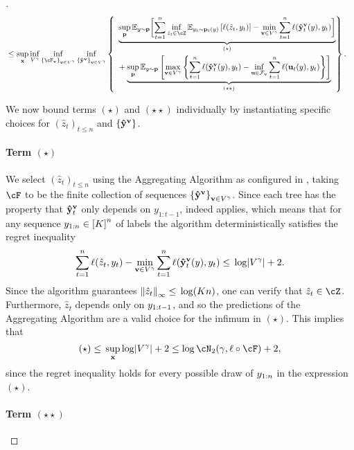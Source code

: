 \begin{proof}[]
{\begin{align}
& \leq\sup_{\x}\inf_{V^{\gamma}}\inf_{\crl*{\cF_{\vv}}_{\vv\in{}V^{\gamma}}}\inf_{\crl*{\yhtree^{\vv}}_{\vv\in{}V^{\gamma}}}\left\{\begin{aligned}~& \underbrace{\sup_{\p} \mathbb{E}_{y \sim \p}\biggl[ \sum_{t=1}^n \inf_{\hat{z}_t\in\cZ} \mathbb{E}_{y_t \sim \p_t(y)}\left[\ell(\hat{z}_t,y_t)\right] - \min_{\vv \in V^\gamma}\sum_{t=1}^n \ell(\yhtree_t^\vv(y),y_t)\biggr]}_{(\star)} \\
  & + \underbrace{\sup_{\p}\mathbb{E}_{y \sim \p}\left[ \max_{\vv \in V^\gamma}\left\{ \sum_{t=1}^n \ell(\yhtree_t^\vv(y),y_t) -  \inf_{\uu \in \mathcal{F}_\vv} \sum_{t=1}^n \ell(\uu_t(y),y_t)\right\}\right]}_{(\star\star)}
  \end{aligned}\right\}.\label{eq:interval}
\end{align}}

We now bound terms $(\star)$ and $(\star\star)$ individually by instantiating specific choices for $(\hat{z}_t)_{t\leq{}n}$ and $\crl*{\yhtree^{\vv}}$.

\paragraph{Term $(\star)$}
We select $(\hat{z}_t)_{t\leq{}n}$ using the Aggregating Algorithm as configured in , taking $\cF$ to be the finite collection of sequences $\crl*{\yhtree^{\vv}}_{\vv\in{}V^{\gamma}}$. Since each tree has the property that $\yhtree^{\vv}_{t}$ only depends on $y_{1:t-1}$,  indeed applies, which means that for any sequence $\yr[n]\in\brk*{K}^{n}$ of labels the algorithm deterministically satisfies the regret inequality
\[
\sum_{t=1}^n \ell(\hat{z}_t,y_t) - \min_{\vv \in V^\gamma}\sum_{t=1}^n \ell(\yhtree_t^\vv(y),y_t) \leq{} \log\abs*{V^{\gamma}} + 2.
\]
Since the algorithm guarantees $\nrm*{\hat{z}_{t}}_{\infty}\leq{}\log(Kn)$, one can verify that $\hat{z}_{t}\in\cZ$. Furthermore, $\hat{z}_{t}$ depends only on $\yr[t-1]$, and so the predictions of the Aggregating Algorithm are a valid choice for the infimum in $(\star)$. This implies that
\[
(\star) \leq{} \sup_{\x}\log\abs*{V^{\gamma}} + 2 \leq \log\cN_{2}(\gamma, \ls\circ\cF) + 2,
\]
since the regret inequality holds for every possible draw of $\yr[n]$ in the expression $(\star)$.

\paragraph{Term $(\star\star)$}


\end{proof}

